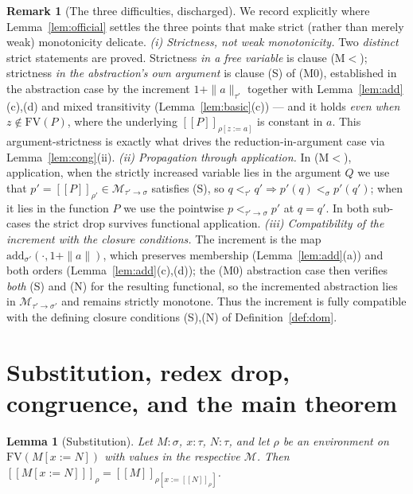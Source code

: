 \documentclass{amsart}
\newtheorem{lemma}{Lemma}
\theoremstyle{definition}
\newtheorem{remark}{Remark}
\newcommand{\interp}[1]{[\![#1]\!]}
\newcommand{\FV}{\mathrm{FV}}
\begin{document}
\begin{remark}[The three difficulties, discharged]\label{rem:threehard}
We record explicitly where Lemma~\ref{lem:official} settles the three points that make
strict (rather than merely weak) monotonicity delicate.
\emph{(i) Strictness, not weak monotonicity.} Two \emph{distinct} strict statements are
proved. Strictness \emph{in a free variable} is clause (M$<$); strictness \emph{in the
abstraction's own argument} is clause (S) of (M0), established in the abstraction case by the
increment $1{+}\|a\|_{\tau'}$ together with Lemma~\ref{lem:add}(c),(d) and mixed transitivity
(Lemma~\ref{lem:basic}(c)) --- and it holds \emph{even when} $z\notin\FV(P)$, where the
underlying $\interp{P}_{\rho[z:=a]}$ is constant in $a$. This argument-strictness is exactly
what drives the reduction-in-argument case via Lemma~\ref{lem:cong}(ii).
\emph{(ii) Propagation through application.} In (M$<$), application, when the strictly
increased variable lies in the argument $Q$ we use that $p'=\interp{P}_{\rho'}\in
\mathcal M_{\tau'\to\sigma}$ satisfies (S), so $q<_{\tau'}q'\Rightarrow p'(q)<_\sigma p'(q')$;
when it lies in the function $P$ we use the pointwise $p<_{\tau'\to\sigma}p'$ at $q=q'$. In
both sub-cases the strict drop survives functional application.
\emph{(iii) Compatibility of the increment with the closure conditions.} The increment is the
map $\mathrm{add}_{\sigma'}(\cdot,1{+}\|a\|)$, which preserves membership
(Lemma~\ref{lem:add}(a)) and both orders (Lemma~\ref{lem:add}(c),(d)); the (M0) abstraction
case then verifies \emph{both} (S) and (N) for the resulting functional, so the incremented
abstraction lies in $\mathcal M_{\tau'\to\sigma'}$ and remains strictly monotone. Thus the
increment is fully compatible with the defining closure conditions (S),(N) of
Definition~\ref{def:dom}.
\end{remark}

\section{Substitution, redex drop, congruence, and the main theorem}

\begin{lemma}[Substitution]\label{lem:subst}
Let $M:\sigma$, $x:\tau$, $N:\tau$, and let $\rho$ be an environment on $\FV(M[x:=N])$ with
values in the respective $\mathcal M$. Then
$\interp{M[x:=N]}_\rho=\interp{M}_{\rho[x:=\interp{N}_\rho]}$.
\end{lemma}
\end{document}
